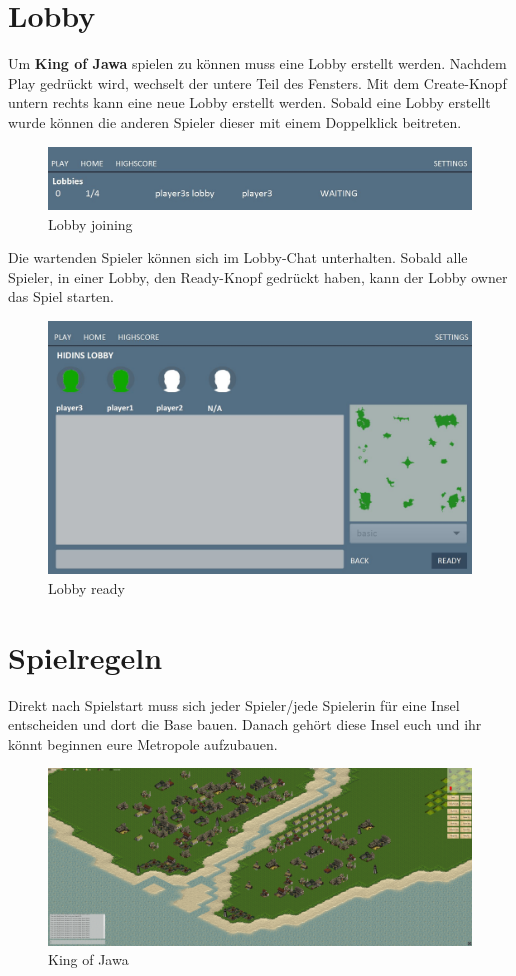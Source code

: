 \documentclass{scrartcl}
\begin{document}
\section{Lobby}
Um \textbf{King of Jawa} spielen zu können muss eine Lobby erstellt werden. Nachdem Play gedrückt wird, wechselt der untere Teil des Fensters. Mit dem Create-Knopf untern rechts kann eine neue Lobby erstellt werden. Sobald eine Lobby erstellt wurde können die anderen Spieler dieser mit einem Doppelklick beitreten.
\begin{figure}[H]
	\includegraphics[width=\linewidth]{joiningLobby.JPG}
	\caption{Lobby joining}
	\label{fig:joiningLobby}
\end{figure}
Die wartenden Spieler können sich im Lobby-Chat unterhalten. Sobald alle Spieler, in einer Lobby, den Ready-Knopf gedrückt haben, kann der Lobby owner das Spiel starten. 
\begin{figure}[H]
	\includegraphics[width=\linewidth]{readylobby.JPG}
	\caption{Lobby ready}
	\label{fig:readyLobby}
\end{figure}

\pagebreak
\section{Spielregeln}
Direkt nach Spielstart muss sich jeder Spieler/jede Spielerin für eine Insel entscheiden und dort die Base bauen. Danach gehört diese Insel euch und ihr könnt beginnen eure Metropole aufzubauen.

\begin{figure}[H]
	\includegraphics[width=\linewidth]{kingofjawa.png}
	\caption{King of Jawa}
	\label{fig:kingofjawa}
\end{figure}
\end{document}
